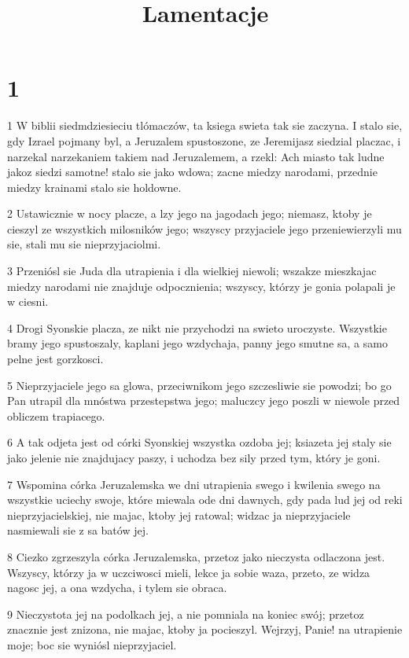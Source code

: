 

\title{Lamentacje}


\chapter{1}

\par 1 W biblii siedmdziesieciu tlómaczów, ta ksiega swieta tak sie zaczyna. I stalo sie, gdy Izrael pojmany byl, a Jeruzalem spustoszone, ze Jeremijasz siedzial placzac, i narzekal narzekaniem takiem nad Jeruzalemem, a rzekl: Ach miasto tak ludne jakoz siedzi samotne! stalo sie jako wdowa; zacne miedzy narodami, przednie miedzy krainami stalo sie holdowne.
\par 2 Ustawicznie w nocy placze, a lzy jego na jagodach jego; niemasz, ktoby je cieszyl ze wszystkich milosników jego; wszyscy przyjaciele jego przeniewierzyli mu sie, stali mu sie nieprzyjaciolmi.
\par 3 Przeniósl sie Juda dla utrapienia i dla wielkiej niewoli; wszakze mieszkajac miedzy narodami nie znajduje odpocznienia; wszyscy, którzy je gonia polapali je w ciesni.
\par 4 Drogi Syonskie placza, ze nikt nie przychodzi na swieto uroczyste. Wszystkie bramy jego spustoszaly, kaplani jego wzdychaja, panny jego smutne sa, a samo pelne jest gorzkosci.
\par 5 Nieprzyjaciele jego sa glowa, przeciwnikom jego szczesliwie sie powodzi; bo go Pan utrapil dla mnóstwa przestepstwa jego; maluczcy jego poszli w niewole przed obliczem trapiacego.
\par 6 A tak odjeta jest od córki Syonskiej wszystka ozdoba jej; ksiazeta jej staly sie jako jelenie nie znajdujacy paszy, i uchodza bez sily przed tym, który je goni.
\par 7 Wspomina córka Jeruzalemska we dni utrapienia swego i kwilenia swego na wszystkie uciechy swoje, które miewala ode dni dawnych, gdy pada lud jej od reki nieprzyjacielskiej, nie majac, ktoby jej ratowal; widzac ja nieprzyjaciele nasmiewali sie z sa batów jej.
\par 8 Ciezko zgrzeszyla córka Jeruzalemska, przetoz jako nieczysta odlaczona jest. Wszyscy, którzy ja w uczciwosci mieli, lekce ja sobie waza, przeto, ze widza nagosc jej, a ona wzdycha, i tylem sie obraca.
\par 9 Nieczystota jej na podolkach jej, a nie pomniala na koniec swój; przetoz znacznie jest znizona, nie majac, ktoby ja pocieszyl. Wejrzyj, Panie! na utrapienie moje; boc sie wyniósl nieprzyjaciel.
